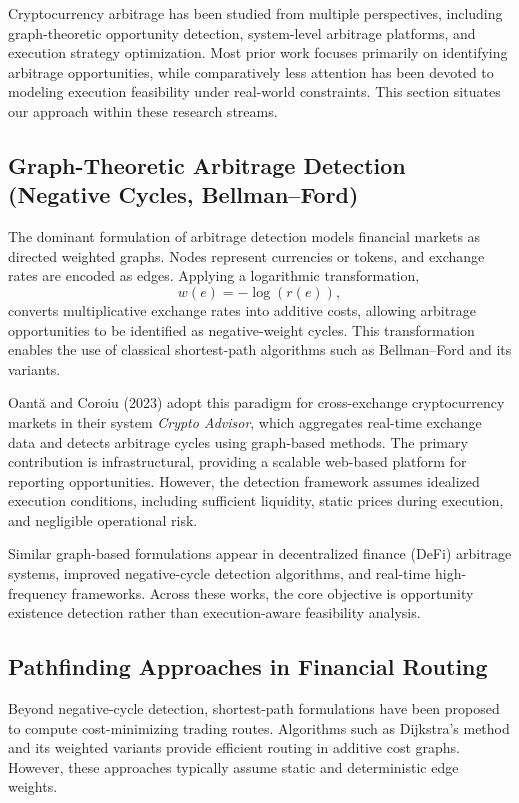 Cryptocurrency arbitrage has been studied from multiple perspectives, including graph-theoretic opportunity detection, system-level arbitrage platforms, and execution strategy optimization. Most prior work focuses primarily on identifying arbitrage opportunities, while comparatively less attention has been devoted to modeling execution feasibility under real-world constraints. This section situates our approach within these research streams.

\subsection{Graph-Theoretic Arbitrage Detection (Negative Cycles, Bellman--Ford)}

The dominant formulation of arbitrage detection models financial markets as directed weighted graphs. Nodes represent currencies or tokens, and exchange rates are encoded as edges. Applying a logarithmic transformation,
\[
w(e) = -\log(r(e)),
\] %
converts multiplicative exchange rates into additive costs, allowing arbitrage opportunities to be identified as negative-weight cycles. This transformation enables the use of classical shortest-path algorithms such as Bellman--Ford and its variants.

Oantă and Coroiu (2023) adopt this paradigm for cross-exchange cryptocurrency markets in their system \emph{Crypto Advisor}, which aggregates real-time exchange data and detects arbitrage cycles using graph-based methods. The primary contribution is infrastructural, providing a scalable web-based platform for reporting opportunities. However, the detection framework assumes idealized execution conditions, including sufficient liquidity, static prices during execution, and negligible operational risk.

Similar graph-based formulations appear in decentralized finance (DeFi) arbitrage systems, improved negative-cycle detection algorithms, and real-time high-frequency frameworks. Across these works, the core objective is opportunity existence detection rather than execution-aware feasibility analysis.

\subsection{Pathfinding Approaches in Financial Routing}

Beyond negative-cycle detection, shortest-path formulations have been proposed to compute cost-minimizing trading routes. Algorithms such as Dijkstra’s method and its weighted variants provide efficient routing in additive cost graphs. However, these approaches typically assume static and deterministic edge weights.

